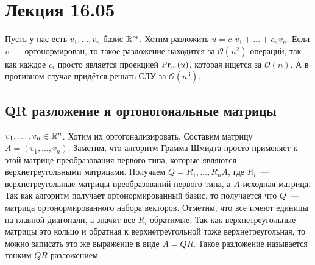\section{Лекция 16.05}
\begin{motivation}
    Пусть у нас есть $v_1,\dots, v_n$ базис $\mathbb{R}^m$.
    Хотим разложить $u = c_1 v_1 + \dots + c_n v_n$. Если $v$~--- ортонормирован,
    то такое разложение находится за $\mathcal{O}(n^2)$ операций, так как каждое
    $c_i$ просто является проекцией $\operatorname{Pr}_{v_i}(u)$, которая ищется за $\mathcal{O}(n)$.
    А в противном случае придётся решать СЛУ за $\mathcal{O}(n^3)$.
\end{motivation}
\subsection{QR разложение и ортоногональные матрицы}

$v_1,\dots, v_n \in \mathbb{R}^n$. Хотим их ортогонализировать.
Составим матрицу $A = \left(v_1,\dots, v_n\right)$. Заметим, что
алгоритм Грамма-Шмидта просто применяет к этой матрице преобразования
первого типа, которые являются верхнетреугольными матрицами.
Получаем  $Q = R_1,\dots, R_n A$, где $R_i$~--- верхнетреугольные матрицы
преобразований первого типа, а $A$ исходная матрица. Так как алгоритм
получает ортонормированный базис, то получается что $Q$~--- матрица ортонормированного
набора векторов. Отметим, что все имеют единицы на главной диагонали,
а значит все $R_i$ обратимые.
Так как верхнетреугольные матрицы это кольцо и обратная к верхнетреугольной
тоже верхнетреугольная, то можно записать это же
выражение в виде $A = QR$. Такое разложение называется 
тонким $QR$ разложением.

